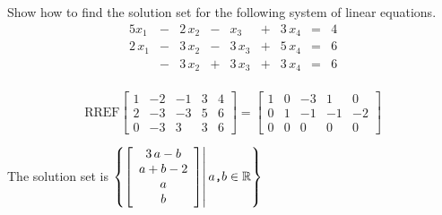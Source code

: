 
\begin{exerciseStatement}


Show how to find the solution set for the following system of linear equations. 
\begin{alignat*}{5} x_{1} &-& 2 \, x_{2} &-& x_{3} &+& 3 \, x_{4} &=& 4 \\2 \, x_{1} &-& 3 \, x_{2} &-& 3 \, x_{3} &+& 5 \, x_{4} &=& 6 \\ &-& 3 \, x_{2} &+& 3 \, x_{3} &+& 3 \, x_{4} &=& 6 \\ \end{alignat*}
            


\end{exerciseStatement}
    
\begin{exerciseAnswer} 
\[\mathrm{RREF} \left[\begin{array}{cccc|c}
1 & -2 & -1 & 3 & 4 \\
2 & -3 & -3 & 5 & 6 \\
0 & -3 & 3 & 3 & 6
\end{array}\right]  =  \left[\begin{array}{cccc|c}
1 & 0 & -3 & 1 & 0 \\
0 & 1 & -1 & -1 & -2 \\
0 & 0 & 0 & 0 & 0
\end{array}\right] \]

The solution set is \( \left\{ \left[\begin{array}{c}
3 \, a - b \\
a + b - 2 \\
a \\
b
\end{array}\right] \middle|\,a\text{\texttt{,}}b\in\mathbb{R}\right\} \)


\end{exerciseAnswer}
    

